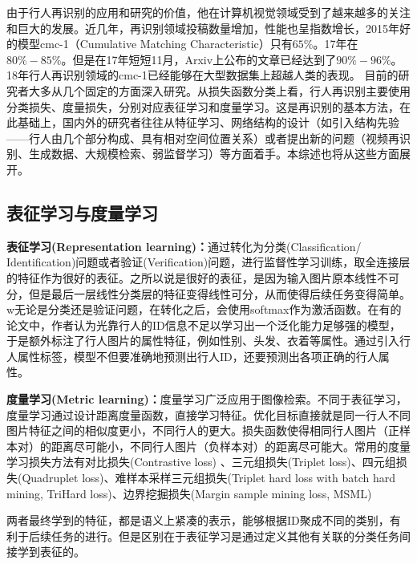 由于行人再识别的应用和研究的价值，他在计算机视觉领域受到了越来越多的关注和巨大的发展。近几年，再识别领域投稿数量增加，性能也呈指数增长，2015年好的模型cmc-1（Cumulative Matching Characteristic）只有$65\%$。17年在$80\%-85\%$。但是在17年短短11月，Arxiv上公布的文章已经达到了$90\%-96\%$。18年行人再识别领域的cmc-1已经能够在大型数据集上超越人类的表现。
目前的研究者大多从几个固定的方面深入研究。从损失函数分类上看，行人再识别主要使用分类损失、度量损失，分别对应表征学习和度量学习。这是再识别的基本方法，在此基础上，国内外的研究者往往从特征学习、网络结构的设计（如引入结构先验——行人由几个部分构成、具有相对空间位置关系）或者提出新的问题（视频再识别、生成数据、大规模检索、弱监督学习）等方面着手。本综述也将从这些方面展开。

\subsection{表征学习与度量学习}

\textbf{表征学习(Representation learning)：}通过转化为分类(Classification/ Identification)问题或者验证(Verification)问题，进行监督性学习训练，取全连接层的特征作为很好的表征。之所以说是很好的表征，是因为输入图片原本线性不可分，但是最后一层线性分类层的特征变得线性可分，从而使得后续任务变得简单。w无论是分类还是验证问题，在转化之后，会使用softmax作为激活函数。在有的论文中，作者认为光靠行人的ID信息不足以学习出一个泛化能力足够强的模型，于是额外标注了行人图片的属性特征，例如性别、头发、衣着等属性。通过引入行人属性标签，模型不但要准确地预测出行人ID，还要预测出各项正确的行人属性。

\textbf{度量学习(Metric learning)：}度量学习广泛应用于图像检索。不同于表征学习，度量学习通过设计距离度量函数，直接学习特征。优化目标直接就是同一行人不同图片特征之间的相似度更小，不同行人的更大。损失函数使得相同行人图片（正样本对）的距离尽可能小，不同行人图片（负样本对）的距离尽可能大。常用的度量学习损失方法有对比损失(Contrastive loss) \cite{varior2016gated}、三元组损失(Triplet loss)、四元组损失(Quadruplet loss)、难样本采样三元组损失(Triplet hard loss with batch hard mining, TriHard loss)\cite{hermans2017defense}、边界挖掘损失(Margin sample mining loss, MSML)

两者最终学到的特征，都是语义上紧凑的表示，能够根据ID聚成不同的类别，有利于后续任务的进行。但是区别在于表征学习是通过定义其他有关联的分类任务间接学到表征的。

